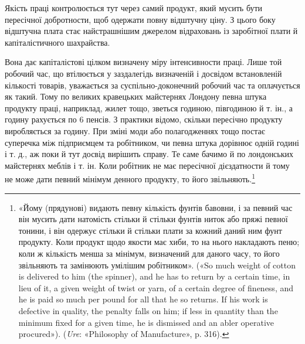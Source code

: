 Якість праці контролюється тут через самий продукт, який
мусить бути пересічної добротности, щоб одержати повну відштучну
ціну. З цього боку відштучна плата стає найстрашнішим
джерелом відраховань із заробітної плати й капіталістичного
шахрайства.

Вона дає капіталістові цілком визначену міру інтенсивности
праці. Лише той робочий час, що втілюється у заздалегідь визначеній
і досвідом встановленій кількості товарів, уважається за
суспільно-доконечний робочий час та оплачується як такий.
Тому по великих кравецьких майстернях Лондону певна штука
продукту праці, наприклад, жилет тощо, зветься годиною,
півгодиною й т. ін., а годину рахується по 6 пенсів. З практики
відомо, скільки пересічно продукту виробляється за годину.
При зміні моди або полагодженнях тощо постає суперечка між
підприємцем та робітником, чи певна штука дорівнює одній годині
і т. д., аж поки й тут досвід вирішить справу. Те саме бачимо й
по лондонських майстернях меблів і т. ін. Коли робітник не має
пересічної дієздатности й тому не може дати певний мінімум денного
продукту, то його звільняють.\footnote{
«Йому (прядунові) видають певну кількість фунтів бавовни, і за
певний час він мусить дати натомість стільки й стільки фунтів ниток
або пряжі певної тонини, і він одержує стільки й стільки плати за кожний
даний ним фунт продукту. Коли продукт щодо якости має хиби, то
на нього накладають пеню; коли ж кількість менша за мінімум, визначений
для даного часу, то його звільняють та замінюють умілішим робітником».
(«So much weight of cotton is delivered to him (the spinner),
and he has to return by a certain time, in lieu of it, a given weight of
twist or yarn, of a certain degree of fineness, and he is paid so much per
pound for all that he so returns. If his work is defective in quality, the
penalty falls on him; if less in quantity than the minimum fixed for a
given time, he is dismissed and an abler operative procured»). (\emph{Ure}: «Philosophy
of Manufacture», p. 316).
}

